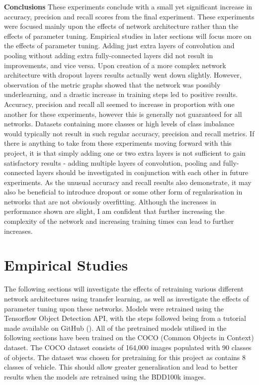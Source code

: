 \documentclass[12pt]{report}
\begin{document}
\begin{flushleft}
\vspace{0.5cm}
\textbf{Conclusions}
\linebreak
These experiments conclude with a small yet significant increase in accuracy, precision and recall scores from the final experiment. These experiments were focused mainly upon the effects of network architecture rather than the effects of parameter tuning. Empirical studies in later sections will focus more on the effects of parameter tuning. Adding just extra layers of convolution and pooling without adding extra fully-connected layers did not result in improvements, and vice versa. Upon creation of a more complex network architecture with dropout layers results actually went down slightly. However, observation of the metric graphs showed that the network was possibly underlearning, and a drastic increase in training steps led to positive results. Accuracy, precision and recall all seemed to increase in proportion with one another for these experiments, however this is generally not guaranteed for all networks. Datasets containing more classes or high levels of class imbalance would typically not result in such regular accuracy, precision and recall metrics. If there is anything to take from these experiments moving forward with this project, it is that simply adding one or two extra layers is not sufficient to gain satisfactory results - adding multiple layers of convolution, pooling and fully-connected layers should be investigated in conjunction with each other in future experiments. As the unusual accuracy and recall results also demonstrate, it may also be beneficial to introduce dropout or some other form of regularisation in networks that are not obviously overfitting. Although the increases in performance shown are slight, I am confident that further increasing the complexity of the network and increasing training times can lead to further increases.
\end{flushleft}

\newpage
\chapter{Empirical Studies}
\begin{flushleft}
The following sections will investigate the effects of retraining various different network architectures using transfer learning, as well as investigate the effects of parameter tuning upon these networks. Models were retrained using the Tensorflow Object Detection API, with the steps followed being from a tutorial made available on GitHub (\cite{tutorial}). All of the pretrained models utilised in the following sections have been trained on the COCO (Common Objects in Context) dataset. The COCO dataset consists of 164,000 images populated with 90 classes of objects. The dataset was chosen for pretraining for this project as contains 8 classes of vehicle. This should allow greater generalisation and lead to better results when the models are retrained using the BDD100k images.
\end{flushleft}
\end{document}
